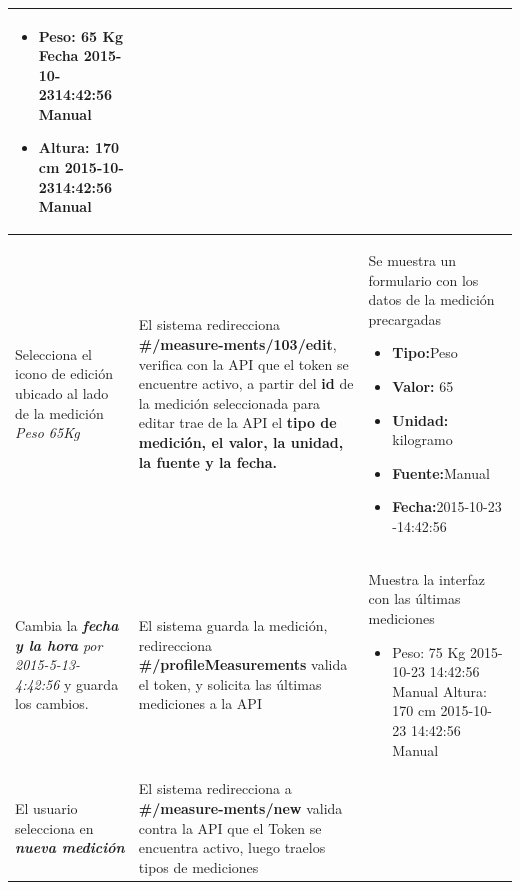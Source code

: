 \documentclass[a4paper,12pt]{article}
\begin{document}
\begin{longtable}{|p{5cm}|p{5cm}|p{5cm}|}
\begin{itemize}
	\item Peso: 65 Kg Fecha 2015-10-2314:42:56 Manual
	\item Altura: 170 cm 2015-10-2314:42:56 Manual

\end{itemize}


\\ \hline






Selecciona el icono de edición ubicado al lado de la medición \textit{Peso 65Kg}
& El sistema redirecciona \textbf{\#/measure-ments/103/edit}, verifica con la API que el token se encuentre activo, a partir del\textbf{ id} de la medición seleccionada para editar trae de la API el \textbf{tipo de medición, el valor, la unidad, la fuente y la fecha.}

& Se muestra un formulario con los datos de la medición precargadas
\begin{itemize}
	\item \textbf{Tipo:}Peso 
	\item \textbf{Valor: }65 
	\item \textbf{Unidad:} kilogramo
	\item \textbf{Fuente:}Manual 
	\item \textbf{Fecha:}2015-10-23 -14:42:56
\end{itemize}
\\ \hline





Cambia la \textit{\textbf{fecha y la hora} por 2015-5-13- 4:42:56 }y guarda los cambios.
& El sistema guarda la medición, redirecciona\textbf{ \#/profileMeasurements }valida el token, y solicita las últimas mediciones a la API

& Muestra la interfaz con las últimas mediciones 
\begin{itemize}
	\item Peso: 75 Kg 2015-10-23 14:42:56 Manual Altura: 170 cm 2015-10-23 14:42:56 Manual
\end{itemize}
\\ \hline





El usuario selecciona en \textit{\textbf{nueva medición}}
& El sistema redirecciona a \textbf{\#/measure-ments/new} valida contra la API que el Token se encuentra activo, luego traelos tipos de mediciones


\end{longtable}
\end{document}
